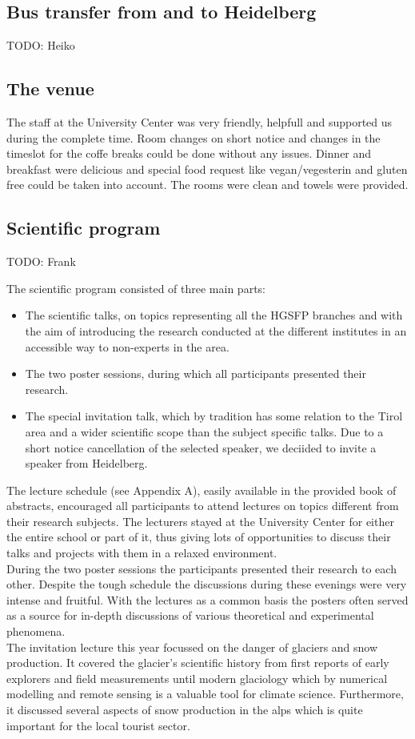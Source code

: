 \documentclass[11pt,a4paper]{article}
\numberwithin{equation}{section}
\numberwithin{table}{section}\setlength{\multlinegap}{25pt}
\begin{document}
\subsection*{Bus transfer from and to Heidelberg}
TODO: Heiko

\subsection*{The venue}

The staff at the University Center was very friendly, helpfull and supported
us during the complete time. Room changes on short notice and changes in the
timeslot for the coffe breaks could be done without any issues. 
Dinner and breakfast were delicious and special food request like
vegan/vegesterin and gluten free could be taken into account.\newline
The rooms were clean and towels were provided. 
\subsection*{Scientific program}

TODO: Frank

\noindent The scientific program consisted of three main parts: 
\begin{itemize}
\item The scientific talks, on topics representing all the HGSFP branches and with the aim of introducing the research conducted at the different institutes in an accessible way to non-experts in the area. 
\item The two poster sessions, during which all participants presented their research.
\item The special invitation talk, which by tradition has some relation to the
  Tirol area and a wider scientific scope than the subject specific talks. Due
  to a short notice cancellation of the selected speaker, we deciided to
  invite a speaker from Heidelberg. 
\end{itemize}

The lecture schedule (see Appendix A), easily available in the provided book of abstracts, encouraged all participants to attend lectures on topics different from their research subjects. The lecturers stayed at the University Center for either the entire school or part of it, thus giving lots of opportunities to discuss their talks and projects with them in a relaxed environment. \\
During the two poster sessions the participants presented their research to each other. Despite the tough schedule the discussions during these evenings were very intense and fruitful. With the lectures as a common basis the posters often served as a source for in-depth discussions of various theoretical and experimental phenomena. \\
The invitation lecture this year focussed on the danger of glaciers and snow production. It covered the glacier's scientific history from first reports of early explorers and field measurements until modern glaciology which by numerical modelling and remote sensing is a valuable tool for climate science. Furthermore, it discussed several aspects of snow production in the alps which is quite important for the local tourist sector.
\end{document}
